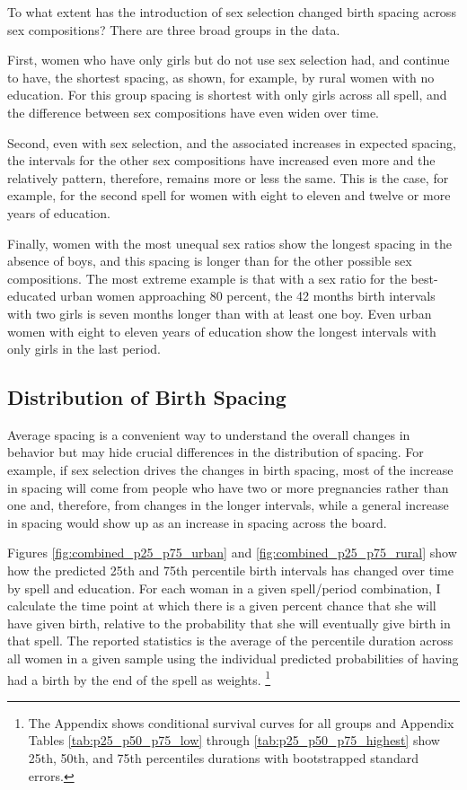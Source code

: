 \documentclass[12pt,letterpaper]{article}
\begin{document}
To what extent has the introduction of sex selection changed birth spacing across sex 
compositions?
There are three broad groups in the data.

First, women who have only girls but do not use sex selection had, and continue to have,
the shortest spacing, as shown, for example, by rural women with no education.
For this group spacing is shortest with only girls across all spell, and the difference
between sex compositions have even widen over time.

Second, even with sex selection, and the associated increases in expected spacing, the
intervals for the other sex compositions have increased even more and the relatively 
pattern, therefore, remains more or less the same.
This is the case, for example, for the second spell for women with eight to eleven
and twelve or more years of education.

Finally, women with the most unequal sex ratios show the longest spacing in the 
absence of boys, and this spacing is longer than for the other possible sex 
compositions.
The most extreme example is that with a sex ratio for the best-educated urban women  
approaching 80 percent, the 42 months birth intervals with two girls is seven months 
longer than with at least one boy.
Even urban women with eight to eleven years of education show the longest intervals with 
only girls in the last period.




\subsection{Distribution of Birth Spacing}

Average spacing is a convenient way to understand the overall changes in behavior but may 
hide crucial differences in the distribution of spacing.
For example, if sex selection drives the changes in birth spacing, most of the increase in 
spacing will come from people who have two or more pregnancies rather than one and,
therefore, from changes in the longer intervals,
while a general increase in spacing would show up as an increase in spacing across the 
board.

Figures \ref{fig:combined_p25_p75_urban} and \ref{fig:combined_p25_p75_rural} 
show how the predicted 25th and 75th percentile birth intervals has changed over time 
by spell and education.
For each woman in a given spell/period combination, I calculate the time point at 
which there is a given percent chance that she will have given birth, relative to the
probability that she will eventually give birth in that spell.
The reported statistics is the average of the percentile duration
across all women in a given sample using the individual predicted
probabilities of having had a birth by the end of the spell as weights.%
\footnote{
The Appendix shows conditional survival curves for all groups and 
Appendix Tables \ref{tab:p25_p50_p75_low} through \ref{tab:p25_p50_p75_highest} 
show 25th, 50th, and 75th percentiles durations with bootstrapped standard errors.
}
\end{document}
